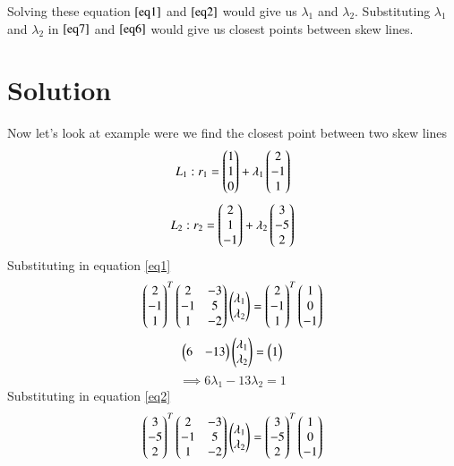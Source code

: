 \documentclass[journal,12pt,twocolumn]{IEEEtran}
\begin{document}
Solving these equation $\eqref{eq1}$ and $\eqref{eq2}$ would give us $\lambda{_1}$ and $\lambda{_2}$. Substituting $\lambda{_1}$ and $\lambda{_2}$ in $\eqref{eq7}$ and $\eqref{eq6}$ would give us closest points between skew lines.

\section{Solution}
Now let's look at example were we find the closest point between two skew lines
\begin{equation}\label{eq4}
    L_1: r_1 = \begin{pmatrix}1\\1\\0\end{pmatrix} + \lambda{_1}\begin{pmatrix}2\\-1\\1\end{pmatrix}
\end{equation}
\begin{equation}\label{eq5}
    L_2: r_2 = \begin{pmatrix}2\\1\\-1\end{pmatrix} + \lambda{_2}\begin{pmatrix}3\\-5\\2\end{pmatrix}
\end{equation}
Substituting in equation \eqref{eq1}
\begin{equation}
    \begin{pmatrix}2\\-1\\1\end{pmatrix}^T\begin{pmatrix}2 & -3\\-1 & 5\\1 & -2\end{pmatrix}\begin{pmatrix}\lambda{_1}\\\lambda{_2}\end{pmatrix} = \begin{pmatrix}2\\-1\\1\end{pmatrix}^T\begin{pmatrix}1\\0\\-1\end{pmatrix}
\end{equation}
\begin{equation}
    \begin{pmatrix}6 & -13\end{pmatrix}\begin{pmatrix}\lambda{_1}\\\lambda{_2}\end{pmatrix} = \begin{pmatrix}1\end{pmatrix}
\end{equation}
\begin{equation}\label{eq3}
    \implies 6\lambda{_1} -13\lambda{_2} = 1
\end{equation}
Substituting in equation \eqref{eq2}
\begin{equation}
    \begin{pmatrix}3\\-5\\2\end{pmatrix}^T\begin{pmatrix}2 & -3\\-1 & 5\\1 & -2\end{pmatrix}\begin{pmatrix}\lambda{_1}\\\lambda{_2}\end{pmatrix} = \begin{pmatrix}3\\-5\\2\end{pmatrix}^T\begin{pmatrix}1\\0\\-1\end{pmatrix}
\end{equation}
\end{document}
